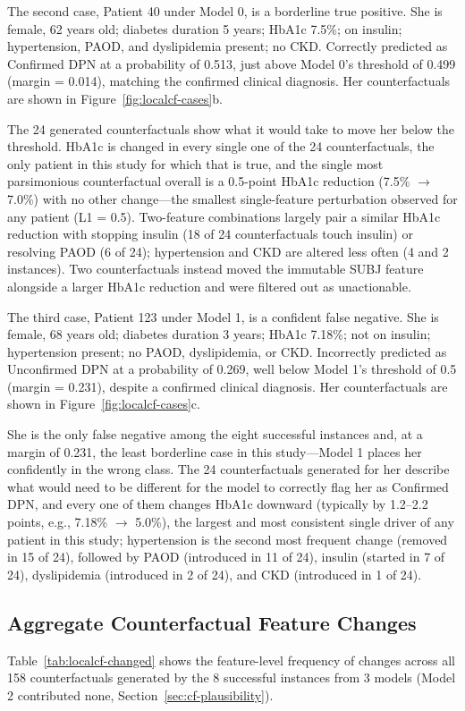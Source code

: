 \documentclass[pdflatex,sn-mathphys-num]{sn-jnl}%
\theoremstyle{thmstyleone}%
\theoremstyle{thmstyletwo}%
\theoremstyle{thmstylethree}%
\begin{document}
The second case, Patient 40 under Model 0, is a borderline true positive. She is female, 62 years old; diabetes duration 5 years; HbA1c 7.5\%; on insulin; hypertension, PAOD, and dyslipidemia present; no CKD. Correctly predicted as Confirmed DPN at a probability of 0.513, just above Model 0's threshold of 0.499 (margin = 0.014), matching the confirmed clinical diagnosis. Her counterfactuals are shown in Figure~\ref{fig:localcf-cases}b.

The 24 generated counterfactuals show what it would take to move her below the threshold. HbA1c is changed in every single one of the 24 counterfactuals, the only patient in this study for which that is true, and the single most parsimonious counterfactual overall is a 0.5-point HbA1c reduction (7.5\% $\to$ 7.0\%) with no other change---the smallest single-feature perturbation observed for any patient (L1 = 0.5). Two-feature combinations largely pair a similar HbA1c reduction with stopping insulin (18 of 24 counterfactuals touch insulin) or resolving PAOD (6 of 24); hypertension and CKD are altered less often (4 and 2 instances). Two counterfactuals instead moved the immutable SUBJ feature alongside a larger HbA1c reduction and were filtered out as unactionable.

The third case, Patient 123 under Model 1, is a confident false negative. She is female, 68 years old; diabetes duration 3 years; HbA1c 7.18\%; not on insulin; hypertension present; no PAOD, dyslipidemia, or CKD. Incorrectly predicted as Unconfirmed DPN at a probability of 0.269, well below Model 1's threshold of 0.5 (margin = 0.231), despite a confirmed clinical diagnosis. Her counterfactuals are shown in Figure~\ref{fig:localcf-cases}c.

She is the only false negative among the eight successful instances and, at a margin of 0.231, the least borderline case in this study---Model 1 places her confidently in the wrong class. The 24 counterfactuals generated for her describe what would need to be different for the model to correctly flag her as Confirmed DPN, and every one of them changes HbA1c downward (typically by 1.2--2.2 points, e.g., 7.18\% $\to$ 5.0\%), the largest and most consistent single driver of any patient in this study; hypertension is the second most frequent change (removed in 15 of 24), followed by PAOD (introduced in 11 of 24), insulin (started in 7 of 24), dyslipidemia (introduced in 2 of 24), and CKD (introduced in 1 of 24).

\subsection{Aggregate Counterfactual Feature Changes}
\label{sec:results-cf-aggregate}
Table~\ref{tab:localcf-changed} shows the feature-level frequency of changes across all 158 counterfactuals generated by the 8 successful instances from 3 models (Model 2 contributed none, Section~\ref{sec:cf-plausibility}).
\end{document}

